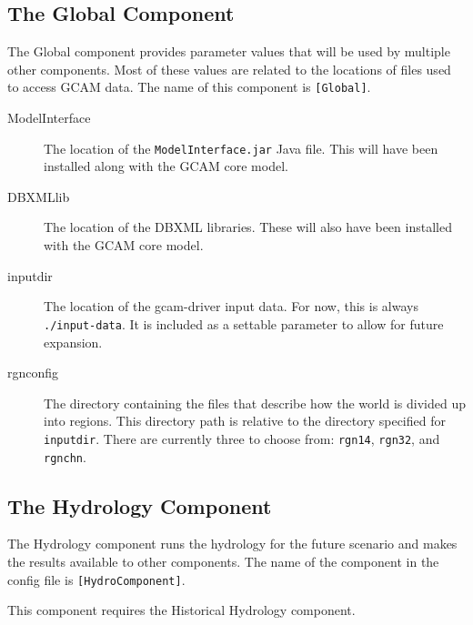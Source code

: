\documentclass[11pt]{article}
\begin{document}
\subsection{The Global Component}
The Global component provides parameter values that will be used by multiple
other components.  Most of these values are related to the locations of
files used to access GCAM data.  The name of this component is
\texttt{[Global]}.
\begin{description}
\item[ModelInterface] The location of the \texttt{ModelInterface.jar}
  Java file.  This will have been installed along with the GCAM core
  model.
\item[DBXMLlib] The location of the DBXML libraries.  These will also
  have been
  installed with the GCAM core model.
\item[inputdir] The location of the gcam-driver input data.  For now,
  this is always \texttt{./input-data}.  It is included as a settable
  parameter to allow for future expansion.
\item[rgnconfig] The directory containing the files that describe how
  the world is divided up into regions.  This directory path is
  relative to the directory specified for \texttt{inputdir}.  There
  are currently three to choose from:  \texttt{rgn14}, \texttt{rgn32},
  and \texttt{rgnchn}.
\end{description}


\subsection{The Hydrology Component}
The Hydrology component runs the hydrology for the future scenario and
makes the results available to other components.  The name of the component
in the config file is \texttt{[HydroComponent]}.

This component requires the Historical Hydrology component.
\end{document}
